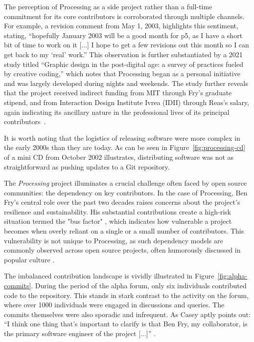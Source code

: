 The perception of Processing as a side project rather than a full-time commitment for its core contributors is corroborated through multiple channels. For example, a revision comment from May 1, 2003, highlights this sentiment, stating, ``hopefully January 2003 will be a good month for p5, as I have a short bit of time to work on it [...] I hope to get a few revisions out this month so I can get back to my `real' work.'' This observation is further substantiated by a 2021 study titled ``Graphic design in the post-digital age: a survey of practices fueled by creative coding,'' which notes that Processing began as a personal initiative and was largely developed during nights and weekends. The study further reveals that the project received indirect funding from MIT through Fry's graduate stipend, and from Interaction Design Institute Ivrea (IDII) through Reas's salary, again indicating its ancillary nature in the professional lives of its principal contributors~\parencite[396]{conradGraphicDesignPostdigital2021}.

It is worth noting that the logistics of releasing software were more complex in the early 2000s than they are today. As can be seen in Figure~\ref{fig:processing-cd} of a mini CD from October 2002 illustrates, distributing software was not as straightforward as pushing updates to a Git repository.



The \textit{Processing} project illuminates a crucial challenge often faced by open source communities: the dependency on key contributors. In the case of Processing, Ben Fry's central role over the past two decades raises concerns about the project's resilience and sustainability. His substantial contributions create a high-risk situation termed the "bus factor" \parencite{BusFactor2023}, which indicates how vulnerable a project becomes when overly reliant on a single or a small number of contributors. This vulnerability is not unique to Processing, as such dependency models are commonly observed across open source projects, often humorously discussed in popular culture \parencite{munroeDependency2020}.

The imbalanced contribution landscape is vividly illustrated in Figure~\ref{fig:alpha-commits}. During the period of the alpha forum, only six individuals contributed code to the repository. This stands in stark contrast to the activity on the forum, where over 1000 individuals were engaged in discussions and queries. The commits themselves were also sporadic and infrequent. As Casey aptly points out: ``I think one thing that’s important to clarify is that Ben Fry, my collaborator, is the primary software engineer of the project [...]'' \parencite[p. 330]{conradGraphicDesignPostdigital2021}.

